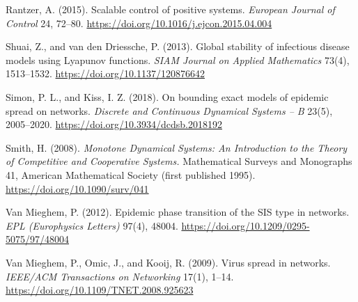 \documentclass[
  11pt,
  a4paper,
]{article}
\begin{document}
Rantzer, A. (2015). Scalable control of positive systems. \emph{European
Journal of Control} 24, 72--80.
\url{https://doi.org/10.1016/j.ejcon.2015.04.004}

Shuai, Z., and van den Driessche, P. (2013). Global stability of
infectious disease models using Lyapunov functions. \emph{SIAM Journal
on Applied Mathematics} 73(4), 1513--1532.
\url{https://doi.org/10.1137/120876642}

Simon, P. L., and Kiss, I. Z. (2018). On bounding exact models of
epidemic spread on networks. \emph{Discrete and Continuous Dynamical
Systems -- B} 23(5), 2005--2020.
\url{https://doi.org/10.3934/dcdsb.2018192}

Smith, H. (2008). \emph{Monotone Dynamical Systems: An Introduction to
the Theory of Competitive and Cooperative Systems.} Mathematical Surveys
and Monographs 41, American Mathematical Society (first published 1995).
\url{https://doi.org/10.1090/surv/041}

Van Mieghem, P. (2012). Epidemic phase transition of the SIS type in
networks. \emph{EPL (Europhysics Letters)} 97(4), 48004.
\url{https://doi.org/10.1209/0295-5075/97/48004}

Van Mieghem, P., Omic, J., and Kooij, R. (2009). Virus spread in
networks. \emph{IEEE/ACM Transactions on Networking} 17(1), 1--14.
\url{https://doi.org/10.1109/TNET.2008.925623}
\end{document}
